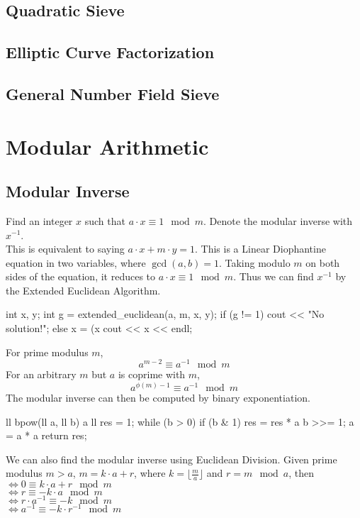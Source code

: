 \documentclass[12pt]{extarticle}
\begin{document}
\subsection*{Quadratic Sieve}
\subsection*{Elliptic Curve Factorization}
\subsection*{General Number Field Sieve}
\section*{Modular Arithmetic}
\subsection*{Modular Inverse}
Find an integer $x$ such that $a\cdot x \equiv 1 \mod m$. Denote the modular inverse with $x^{-1}$.\\
This is equivalent to saying $a\cdot x + m\cdot y = 1$. This is a Linear Diophantine equation in two variables, where $\gcd(a,b)=1$. Taking modulo $m$ on both sides of the equation, it reduces to $a\cdot x \equiv 1 \mod m$. Thus we can find $x^{-1}$ by the Extended Euclidean Algorithm. 
\begin{cpp}
int x, y;
int g = extended_euclidean(a, m, x, y);
if (g != 1) {
    cout << "No solution!";
}
else {
    x = (x %
    cout << x << endl;
}
\end{cpp}
For prime modulus $m$, $$a^{m-2}\equiv a^{-1} \mod m$$
For an arbitrary $m$ but $a$ is coprime with $m$, $$a^{\phi(m)-1}\equiv a^{-1} \mod m$$
The modular inverse can then be computed by binary exponentiation.
\begin{cpp}
ll bpow(ll a, ll b) {
	a %
	ll res = 1;
	while (b > 0) {
		if (b & 1) res = res * a %
		b >>= 1;
		a = a * a %
	}
	return res;
}
\end{cpp}
We can also find the modular inverse using Euclidean Division. Given prime modulus $m > a$, $m=k\cdot a + r$, where $k=\lfloor\frac{m}{a}\rfloor$ and $r=m \mod a$, then \\
$\Leftrightarrow 0\equiv k\cdot a+r \mod m$ \\
$\Leftrightarrow r\equiv -k\cdot a\mod m$ \\
$\Leftrightarrow r\cdot a^{-1}\equiv -k\mod m$\\
$\Leftrightarrow a^{-1}\equiv -k\cdot r^{-1}\mod m$\\
\end{document}
